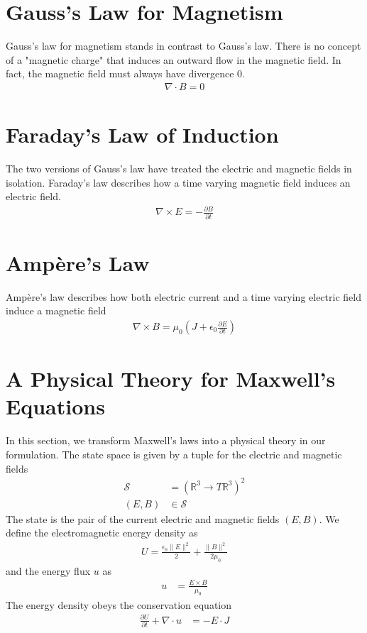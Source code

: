 \documentclass[book.tex]{subfiles}
\begin{document}
\section{Gauss's Law for Magnetism}

Gauss's law for magnetism stands in contrast to Gauss's law. There is no concept of a "magnetic charge" that induces an outward flow in the magnetic field. In fact, the magnetic field must always have divergence 0.
\begin{align}
\nabla \cdot B = 0
\end{align}
\section{Faraday's Law of Induction}

The two versions of Gauss's law have treated the electric and magnetic fields in isolation. Faraday's law describes how a time varying magnetic field induces an electric field.
\begin{align}
\nabla \times E = - \frac{\partial B}{\partial t}
\end{align}
\section{Amp\`{e}re's Law}
Amp\`{e}re's law describes how both electric current and a time varying electric field induce a magnetic field
\begin{align}
\nabla \times B = \mu_0 \left (J + \epsilon_0 \frac{\partial E}{\partial t} \right )
\end{align}

\section{A Physical Theory for Maxwell's Equations}

In this section, we transform Maxwell's laws into a physical theory in our formulation. The state space is given by a tuple for the electric and magnetic fields
\begin{align}
\mathcal{S} &= (\mathbb{R}^3 \to T\mathbb{R}^3)^2 \\
(E, B) &\in \mathcal{S}
\end{align} 
The state is the pair of the current electric and magnetic fields $(E, B)$. We define the electromagnetic energy density as
\begin{align}
U = \frac{\epsilon_0 \|E\|^2}{2} + \frac{\|B\|^2}{2 \mu_0}
\end{align} 
and the energy flux $u$ as
\begin{align}
u &= \frac{E \times B}{\mu_0}
\end{align}
The energy density obeys the conservation equation
\begin{align}
\frac{\partial U}{\partial t} + \nabla \cdot u &= - E \cdot J
\end{align}
\end{document}
